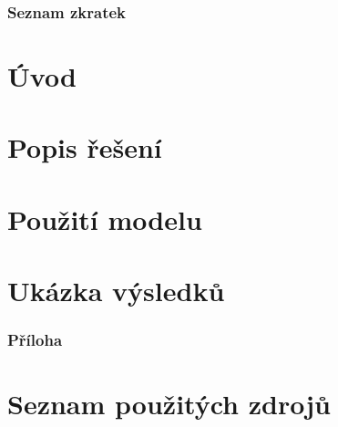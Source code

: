 \documentclass[a4paper, 11pt, twoside]{article}
\begin{document}
  \thispagestyle{empty}
  



  \newpage
  \setcounter{page}{1} %
  \tableofcontents{}


  \newpage
  \section*{Seznam zkratek}
  \begin{multicols}{2}
  
  \end{multicols}



  \newpage
  \setcounter{page}{1}%
  \part*{Úvod}

  

  \newpage
  \part{Popis řešení}\label{cast:1}
  




  \newpage
  \setcounter{section}{0}
  \part{Použití modelu}\label{cast:2}
  

  \newpage
  \part{Ukázka výsledků}
  

  \newpage
  \appendix
  \section*{Příloha}\label{sec:priloha}
  




  \newpage

  \part*{Seznam použitých zdrojů}
  
  
\end{document}
